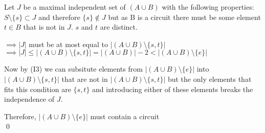 \documentclass[../main.tex]{subfiles}
\begin{document}
 \vspace{2mm}
 
\noindent Let $J$ be a maximal independent set of $(A \cup B)$ with the following properties: $S \setminus \{s\} \subset J $ and therefore $ \{s\} \notin J $ but as B is a circuit there must be some element $t \in B$ that is not in $J$. $s$ and $t$ are distinct.
 
 \vspace{2mm}
 
\noindent $\implies |J| $ must be at most equal to $|(A \cup B) \setminus \{s,t\}| $\\
 $\implies |J| \leq |(A \cup B) \setminus \{s,t\}| = |(A \cup B)| - 2 < |(A \cup B) \setminus \{e\}|$
 
 \vspace{2mm} 
 
 \noindent Now by (I3) we can subsitute elements from $|(A \cup B) \setminus \{e\}|$ into $|(A \cup B) \setminus \{s,t\}|$ that are not in $|(A \cup B) \setminus \{s,t\}|$ but the only elements that fits this condition are $\{s,t\}$ and introducing either of these elements breaks the independence of $J$.
 
\noindent Therefore, $|(A \cup B) \setminus \{e\}|$ must contain a circuit\\
 \qed
 
\end{document}
